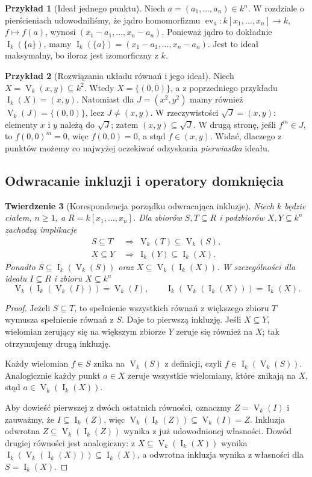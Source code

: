 \documentclass[11pt,a4paper,openany]{report}
\numberwithin{equation}{section}
\theoremstyle{plain}
\newtheorem{twierdzenie}{Twierdzenie}[section]
\theoremstyle{definition}
\newtheorem{przyklad}[twierdzenie]{Przykład}
\theoremstyle{remark}
\newcommand{\V}{\operatorname V}
\newcommand{\I}{\operatorname I}
\newcommand{\ev}{\operatorname{ev}}
\begin{document}
\begin{przyklad}[Ideał jednego punktu]
Niech $a=(a_1,\dots,a_n)\in k^n$. W rozdziale o pierścieniach
udowodniliśmy, że jądro homomorfizmu
$\ev_a:k[x_1,\dots,x_n]\to k$, $f\mapsto f(a)$,
wynosi $(x_1-a_1,\dots,x_n-a_n)$.
Ponieważ jądro to dokładnie $\I_k(\{a\})$, mamy
$\I_k(\{a\})=(x_1-a_1,\dots,x_n-a_n)$.
Jest to ideał maksymalny, bo iloraz jest izomorficzny z $k$.
\end{przyklad}

\begin{przyklad}[Rozwiązania układu równań i jego ideał]
Niech $X=\V_k(x,y)\subseteq k^2$. Wtedy $X=\{(0,0)\}$,
a z poprzedniego przykładu $\I_k(X)=(x,y)$.
Natomiast dla $J=(x^2,y^2)$ mamy również
$\V_k(J)=\{(0,0)\}$, lecz $J\ne(x,y)$.
W rzeczywistości $\sqrt J=(x,y)$: elementy $x$ i $y$
należą do $\sqrt J$; zatem $(x,y)\subseteq\sqrt J$.
W drugą stronę, jeśli $f^m\in J$, to $f(0,0)^m=0$,
więc $f(0,0)=0$, a stąd $f\in(x,y)$.
Widać, dlaczego z punktów możemy co najwyżej oczekiwać
odzyskania \emph{pierwiastka} ideału.
\end{przyklad}

\subsection{Odwracanie inkluzji i operatory domknięcia}

\begin{twierdzenie}[Korespondencja porządku odwracająca inkluzje]
\label{tw:galois}
Niech $k$ będzie ciałem, $n\ge1$, a $R=k[x_1,\dots,x_n]$.
Dla zbiorów $S,T\subseteq R$ i podzbiorów $X,Y\subseteq k^n$
zachodzą implikacje
\begin{align*}
S\subseteq T&\ \Longrightarrow\ \V_k(T)\subseteq\V_k(S),\\
X\subseteq Y&\ \Longrightarrow\ \I_k(Y)\subseteq\I_k(X).
\end{align*}
Ponadto $S\subseteq\I_k(\V_k(S))$ oraz
$X\subseteq\V_k(\I_k(X))$.
W szczególności dla ideału $I\subseteq R$ i zbioru $X\subseteq k^n$
\[
\V_k(\I_k(\V_k(I)))=\V_k(I),\qquad
\I_k(\V_k(\I_k(X)))=\I_k(X).
\]
\end{twierdzenie}
\begin{proof}
Jeżeli $S\subseteq T$, to spełnienie wszystkich równań
z większego zbioru $T$ wymusza spełnienie równań z $S$.
Daje to pierwszą inkluzję. Jeśli $X\subseteq Y$, wielomian
zerujący się na większym zbiorze $Y$ zeruje się również na $X$;
tak otrzymujemy drugą inkluzję.

Każdy wielomian $f\in S$ znika na $\V_k(S)$ z definicji,
czyli $f\in\I_k(\V_k(S))$. Analogicznie każdy punkt $a\in X$
zeruje wszystkie wielomiany, które znikają na $X$, stąd
$a\in\V_k(\I_k(X))$.

Aby dowieść pierwszej z dwóch ostatnich równości, oznaczmy
$Z=\V_k(I)$ i zauważmy, że $I\subseteq\I_k(Z)$, więc
$\V_k(\I_k(Z))\subseteq\V_k(I)=Z$. Inkluzja odwrotna
$Z\subseteq\V_k(\I_k(Z))$ wynika z już udowodnionej własności.
Dowód drugiej równości jest analogiczny: z
$X\subseteq\V_k(\I_k(X))$ wynika
$\I_k(\V_k(\I_k(X)))\subseteq\I_k(X)$,
a odwrotna inkluzja wynika z własności dla $S=\I_k(X)$.
\end{proof}
\end{document}
